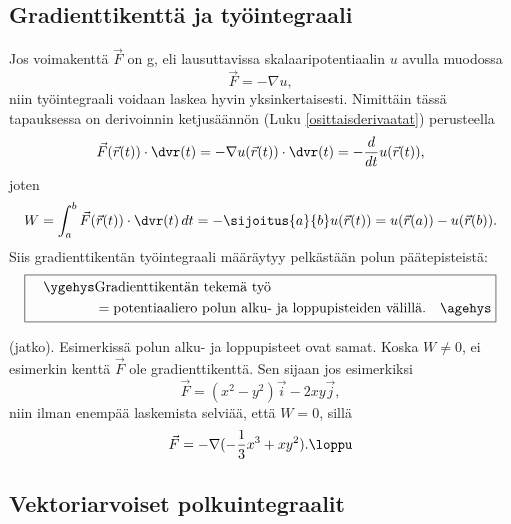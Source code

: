 \subsection*{Gradienttikenttä ja työintegraali}

Jos voimakenttä $\vec F$ on g, eli lausuttavissa skalaaripotentiaalin $u$
avulla muodossa
\[
\vec F=-\nabla u,
\]
niin työintegraali voidaan laskea hyvin yksinkertaisesti. Nimittäin tässä tapauksessa on
derivoinnin ketjusäännön (Luku \ref{osittaisderivaatat}) perusteella
\[
\vec F(\vec r(t))\cdot \dvr(t) = -\nabla u(\vec r(t))\cdot \dvr(t)
                               = -\frac{d}{dt} u(\vec r(t)),
\]
joten
\[
W = \int_a^b \vec F(\vec r(t))\cdot \dvr(t)\,dt 
  = -\sijoitus{a}{b} u(\vec r(t))
  = u(\vec r(a))-u(\vec r(b)).
\]
Siis gradienttikentän työintegraali määräytyy pelkästään polun päätepisteistä:
\[ 
\boxed{ \begin{aligned} \quad\ygehys 
                 &\text{Gradienttikentän tekemä työ} \\
                 &= \text{potentiaaliero polun alku- ja loppupisteiden välillä}. \quad\agehys
           \end{aligned} } 
\]

\jatko \begin{Exa} (jatko). Esimerkissä polun alku- ja loppupisteet ovat samat. Koska
$W\neq 0$, ei esimerkin kenttä $\vec F$ ole gradienttikenttä. Sen sijaan jos esimerkiksi
\[
\vec F=(x^2-y^2)\vec i-2xy\vec j,
\]
niin ilman enempää laskemista selviää, että $W=0$, sillä
\[
\vec F=-\nabla(-\frac{1}{3}x^3+xy^2). \loppu
\]
\end{Exa}

\subsection*{Vektoriarvoiset polkuintegraalit}

